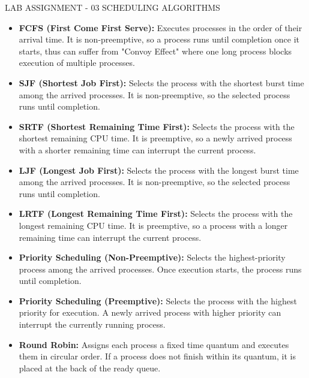 
\assignmenttitle
    {LAB ASSIGNMENT - 03}
    {SCHEDULING ALGORITHMS}


\begin{itemize}
\item\textbf{FCFS (First Come First Serve):} Executes processes in the order of their arrival time. It is non-preemptive, so a process runs until completion once it starts, thus can suffer from "Convoy Effect" where one long process blocks execution of multiple processes.
\item\textbf{SJF (Shortest Job First):} Selects the process with the shortest burst time among the arrived processes. It is non-preemptive, so the selected process runs until completion.
\item\textbf{SRTF (Shortest Remaining Time First):} Selects the process with the shortest remaining CPU time. It is preemptive, so a newly arrived process with a shorter remaining time can interrupt the current process.
\item\textbf{LJF (Longest Job First):} Selects the process with the longest burst time among the arrived processes. It is non-preemptive, so the selected process runs until completion.
\item\textbf{LRTF (Longest Remaining Time First):} Selects the process with the longest remaining CPU time. It is preemptive, so a process with a longer remaining time can interrupt the current process.
\item\textbf{Priority Scheduling (Non-Preemptive):} Selects the highest-priority process among the arrived processes. Once execution starts, the process runs until completion.
\item\textbf{Priority Scheduling (Preemptive):} Selects the process with the highest priority for execution. A newly arrived process with higher priority can interrupt the currently running process.
\item \textbf{Round Robin:} Assigns each process a fixed time quantum and executes them in circular order. If a process does not finish within its quantum, it is placed at the back of the ready queue.
\end{itemize}


\programs

\codelabel

